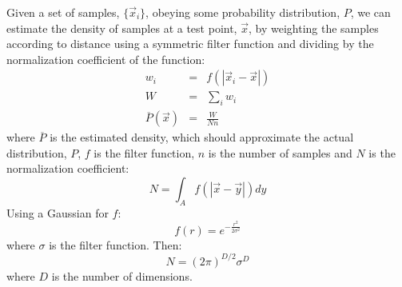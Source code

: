 \documentclass[11pt]{article}
\begin{document}
Given a set of samples, $\lbrace \vec x_i \rbrace$, 
obeying some probability distribution, $P$, we can estimate the
density of samples at a test point, $\vec x$, by weighting the samples
according to distance using a symmetric filter function and dividing
by the normalization coefficient of the function:
\begin{eqnarray}
  w_i & = & f(|\vec x_i -\vec x|) \\
  W & = & \sum_i w_i \\
  \overline P(\vec x) & = & \frac{W}{Nn}
  \label{approx_P}
\end{eqnarray}
where $\overline P$ is the estimated density, which
should approximate the actual distribution, $P$,
$f$ is the filter function, $n$ is the number of samples
and $N$ is the normalization coefficient:
\begin{equation}
  N=\int_A f(|\vec x - \vec y|)dy
\end{equation}
Using a Gaussian for $f$:
\begin{equation}
  f(r)=e^{-\frac{r^2}{2\sigma^2}}
\end{equation}
where $\sigma$ is the filter function.  Then:
\begin{equation}
  N=(2\pi)^{D/2}\sigma^D
  \label{N_def}
\end{equation}
where $D$ is the number of dimensions.
\end{document}
